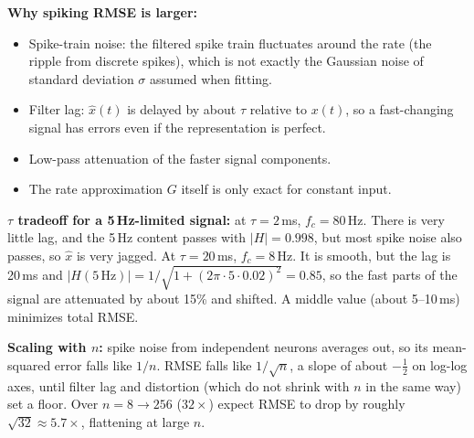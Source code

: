\documentclass[10pt,letterpaper]{article}
\newcommand{\qsec}[1]{\vspace{8pt}{\large\bfseries #1}\par\vspace{2pt}}
\newcommand{\ans}[1]{\par\vspace{3pt}{\bfseries #1}\quad}
\begin{document}
\ans{6d.}
\textbf{Why spiking RMSE is larger:}
\begin{itemize}[leftmargin=1.5em,itemsep=1pt]
\item Spike-train noise: the filtered spike train fluctuates around the rate (the ripple from discrete spikes), which is not exactly the Gaussian noise of standard deviation $\sigma$ assumed when fitting.
\item Filter lag: $\hat x(t)$ is delayed by about $\tau$ relative to $x(t)$, so a fast-changing signal has errors even if the representation is perfect.
\item Low-pass attenuation of the faster signal components.
\item The rate approximation $G$ itself is only exact for constant input.
\end{itemize}
\textbf{$\tau$ tradeoff for a 5\,Hz-limited signal:} at $\tau = 2$\,ms, $f_c = 80$\,Hz. There is very little lag, and the 5\,Hz content passes with $|H| = 0.998$, but most spike noise also passes, so $\hat x$ is very jagged. At $\tau = 20$\,ms, $f_c = 8$\,Hz. It is smooth, but the lag is 20\,ms and $|H(5\,\mathrm{Hz})| = 1/\sqrt{1 + (2\pi\cdot5\cdot0.02)^2} = 0.85$, so the fast parts of the signal are attenuated by about 15\% and shifted. A middle value (about 5--10\,ms) minimizes total RMSE.

\textbf{Scaling with $n$:} spike noise from independent neurons averages out, so its mean-squared error falls like $1/n$. RMSE falls like $1/\sqrt n$, a slope of about $-\tfrac12$ on log-log axes, until filter lag and distortion (which do not shrink with $n$ in the same way) set a floor. Over $n = 8 \to 256$ ($32\times$) expect RMSE to drop by roughly $\sqrt{32} \approx 5.7\times$, flattening at large $n$.

\qsec{7. Feedforward transformations}
\end{document}
